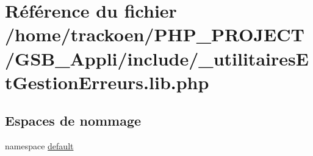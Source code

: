 \hypertarget{__utilitaires_et_gestion_erreurs_8lib_8php}{\section{Référence du fichier /home/trackoen/\-P\-H\-P\-\_\-\-P\-R\-O\-J\-E\-C\-T/\-G\-S\-B\-\_\-\-Appli/include/\-\_\-utilitaires\-Et\-Gestion\-Erreurs.lib.\-php}
\label{__utilitaires_et_gestion_erreurs_8lib_8php}
}
\subsection*{Espaces de nommage}
\begin{DoxyCompactItemize}
\item 
namespace \hyperlink{namespacedefault}{default}
\end{DoxyCompactItemize}
